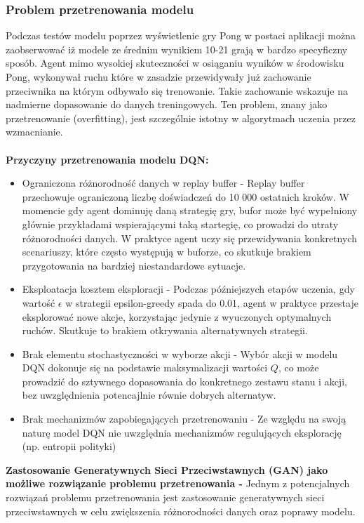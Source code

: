 \documentclass[a4paper, 12pt]{article}
\begin{document}
    \subsubsection{Problem przetrenowania modelu}
    Podczas testów modelu poprzez wyświetlenie gry Pong w postaci aplikacji można zaobserwować iż modele ze średnim wynikiem 10-21 grają w bardzo specyficzny sposób. Agent mimo wysokiej
    skuteczności w osiąganiu wyników w środowisku Pong, wykonywał ruchu które w zasadzie przewidywały już zachowanie przeciwnika na którym odbywało się trenowanie. Takie zachowanie wskazuje
    na nadmierne dopasowanie do danych treningowych. Ten problem, znany jako przetrenowanie (overfitting), jest szczególnie istotny w algorytmach uczenia przez wzmacnianie.
    \\ \\ \textbf{Przyczyny przetrenowania modelu DQN:}
    \begin{itemize}
        \item Ograniczona różnorodność danych w replay buffer - Replay buffer przechowuje ograniczoną liczbę doświadczeń do 10 000 ostatnich kroków. 
        W momencie gdy agent dominuję daną strategię gry, bufor może być wypełniony głównie przykładami wspierającymi taką startegię, co prowadzi do utraty różnorodności danych.
        W praktyce agent uczy się przewidywania konkretnych scenariuszy, które często występują w buforze, co skutkuje brakiem przygotowania na bardziej niestandardowe sytuacje.
        \item Eksploatacja kosztem eksploracji - Podczas późniejszych etapów uczenia, gdy wartość \( \epsilon \) w strategii epsilon-greedy spada do 0.01, agent w praktyce przestaje 
        eksplorować nowe akcje, korzystając jedynie z wyuczonych optymalnych ruchów. Skutkuje to brakiem otkrywania alternatywnych strategii.
        \item Brak elementu stochastyczności w wyborze akcji - Wybór akcji w modelu DQN dokonuje się na podstawie maksymalizacji wartości \( Q \), co może prowadzić do sztywnego
        dopasowania do konkretnego zestawu stanu i akcji, bez uwzględnienia potencajlnie równie dobrych alternatyw.
        \item Brak mechanizmów zapobiegających przetrenowaniu - Ze względu na swoją naturę model DQN nie uwzględnia mechanizmów regulujących eksplorację (np. entropii polityki)
    \end{itemize}
    \textbf{Zastosowanie Generatywnych Sieci Przeciwstawnych (GAN) jako możliwe rozwiązanie problemu przetrenowania - }
    Jednym z potencjalnych rozwiązań problemu przetrenowania jest zastosowanie generatywnych sieci przeciwstawnych w celu zwiększenia różnorodności danych oraz poprawy modelu.
\end{document}
